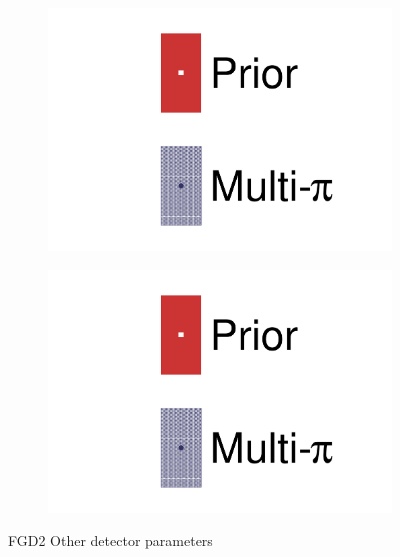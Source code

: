\begin{figure}[h]
	\begin{subfigure}[t]{0.32\textwidth}
		\includegraphics[width=\textwidth,page=42, trim={0mm 0mm 0mm 0mm}, clip]{figures/mach3/2018/data/2018a_FixedCov_RedCov_Mpi_Data_merge_drawPar_withDet}
	\end{subfigure}
	\begin{subfigure}[t]{0.32\textwidth}
		\includegraphics[width=\textwidth,page=43, trim={0mm 0mm 0mm 0mm}, clip]{figures/mach3/2018/data/2018a_FixedCov_RedCov_Mpi_Data_merge_drawPar_withDet}
	\end{subfigure}
	\caption{FGD2 Other detector parameters}
	\label{fig:data_multipi_det_fdg2_ccoth}
\end{figure}

